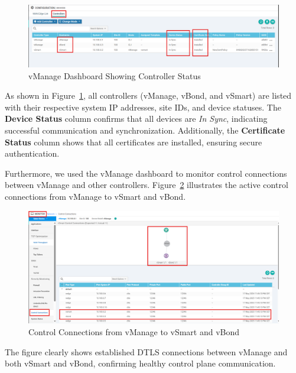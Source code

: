 \documentclass[12pt,english]{report}
\begin{document}
\begin{figure}[H]
    \centering
    \includegraphics[width=1\textwidth]{chapter 4/controllers-connectivity.png}
    \caption{vManage Dashboard Showing Controller Status}
    \label{fig:vmanage_controllers_status}
\end{figure}

As shown in Figure~\ref{fig:vmanage_controllers_status}, all controllers (vManage, vBond, and vSmart) are listed with their respective system IP addresses, site IDs, and device statuses. The \textbf{Device Status} column confirms that all devices are \textit{In Sync}, indicating successful communication and synchronization. Additionally, the \textbf{Certificate Status} column shows that all certificates are installed, ensuring secure authentication.

Furthermore, we used the vManage dashboard to monitor control connections between vManage and other controllers. Figure~\ref{fig:vmanage_control_connections} illustrates the active control connections from vManage to vSmart and vBond.

\begin{figure}[H]
    \centering
    \includegraphics[width=1\textwidth]{chapter 4/control-omp.png}
    \caption{Control Connections from vManage to vSmart and vBond}
    \label{fig:vmanage_control_connections}
\end{figure}

The figure clearly shows established DTLS connections between vManage and both vSmart and vBond, confirming healthy control plane communication.
\end{document}
